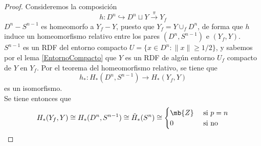 \begin{proof}Consideremos la composición $$h: D^n \hookrightarrow D^n\sqcup Y \xrightarrow{\pi} Y_f$$  $D^n-S^{n-1}$ es homeomorfo a $Y_f-Y$, puesto que $Y_f=Y\cup_f D^n$, de forma que $h$ induce un homeomorfismo relativo entre los pares $(D^n,S^{n-1})$ e $(Y_f,Y)$.
\\

$S^{n-1}$ es un RDF del entorno compacto $U=\{x \in D^n: \|x\| \geq 1/2\}$, y sabemos por el lema \ref{EntornoCompacto} que $Y$ es un RDF de algún entorno $U_f$ compacto de $Y$ en $Y_f$. Por el teorema del homeomorfismo relativo, se tiene que $$h_*: H_*(D^n,S^{n-1}) \longrightarrow H_*(Y_f,Y)$$ es un isomorfismo.
\\

Se tiene entonces que $$H_*(Y_f,Y) \cong H_*(D^n,S^{n-1}) \cong \tilde{H}_*(S^n)\cong\begin{cases}\mb{Z} & \mbox{ si }p=n \\ 0 & \mbox{ si no}\end{cases}$$\end{proof}

\newpage
\begin{prop}
\end{prop}

